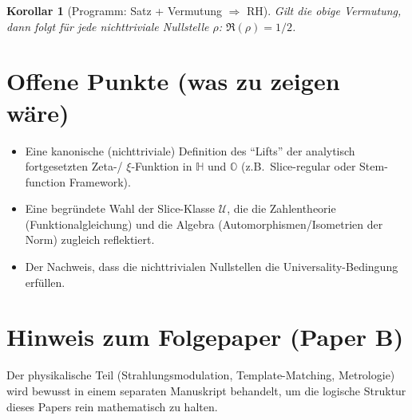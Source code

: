 \documentclass[11pt,a4paper]{article}
\theoremstyle{plain}
\newtheorem{korollar}{Korollar}
\theoremstyle{definition}
\theoremstyle{remark}
\newcommand{\Hh}{\mathbb{H}}
\newcommand{\Okt}{\mathbb{O}}
\begin{document}
\begin{korollar}[Programm: Satz + Vermutung $\Rightarrow$ RH]
Gilt die obige Vermutung, dann folgt f\"ur jede nichttriviale Nullstelle $\rho$:
$\Re(\rho)=1/2$.
\end{korollar}

\section{Offene Punkte (was zu zeigen w\"are)}
\begin{itemize}
\item Eine kanonische (nichttriviale) Definition des ``Lifts'' der analytisch fortgesetzten Zeta-/
$\xi$-Funktion in $\Hh$ und $\Okt$ (z.B.\ Slice-regular oder Stem-function Framework).
\item Eine begr\"undete Wahl der Slice-Klasse $\mathcal{U}$, die die Zahlentheorie (Funktionalgleichung)
und die Algebra (Automorphismen/Isometrien der Norm) zugleich reflektiert.
\item Der Nachweis, dass die nichttrivialen Nullstellen die Universality-Bedingung erf\"ullen.
\end{itemize}

\section*{Hinweis zum Folgepaper (Paper B)}
Der physikalische Teil (Strahlungsmodulation, Template-Matching, Metrologie) wird bewusst in einem
separaten Manuskript behandelt, um die logische Struktur dieses Papers rein mathematisch zu halten.
\end{document}
